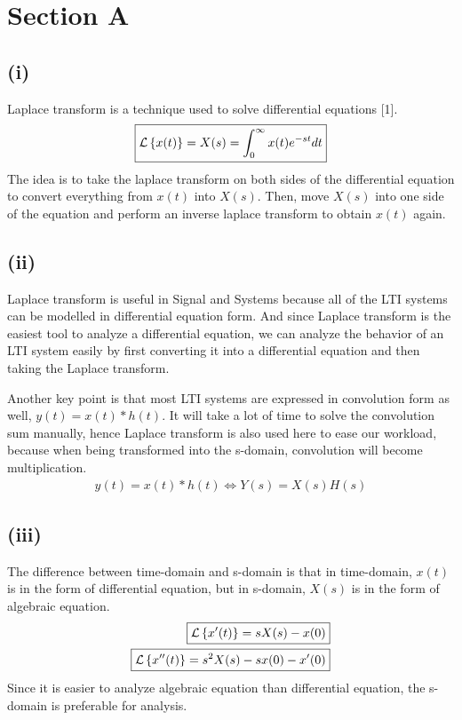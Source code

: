 \section{Section A}
\subsection{(i)}
Laplace transform is a technique used to solve differential equations [1].
\begin{align*}
    \boxed{\mathcal{L}\left\{x(t)\right\} = X(s) = \int_{0}^{\infty}x(t)e^{-st}dt}
\end{align*}
The idea is to take the laplace transform on both sides of the differential equation to convert everything from $x(t)$ into $X(s)$. Then, move $X(s)$ into one side of the equation and perform an inverse laplace transform to obtain $x(t)$ again.

\subsection{(ii)}
Laplace transform is useful in Signal and Systems because all of the LTI systems can be modelled in differential equation form. And since Laplace transform is the easiest tool to analyze a differential equation, we can analyze the behavior of an LTI system easily by first converting it into a differential equation and then taking the Laplace transform.

Another key point is that most LTI systems are expressed in convolution form as well, $y(t) = x(t) * h(t)$. It will take a lot of time to solve the convolution sum manually, hence Laplace transform is also used here to ease our workload, because when being transformed into the s-domain, convolution will become multiplication.
\begin{align*}
    \boxed{y(t)=x(t) * h(t) \Leftrightarrow Y(s)=X(s)H(s)}
\end{align*}

\subsection{(iii)}
The difference between time-domain and s-domain is that in time-domain, $x(t)$ is in the form of differential equation, but in s-domain, $X(s)$ is in the form of algebraic equation.
\begin{align*}
    \boxed{\mathcal{L}\left\{x'(t)\right\}=sX(s)-x(0)}\\
    \boxed{\mathcal{L}\left\{x''(t)\right\}=s^2X(s)-sx(0)-x'(0)}
\end{align*}
Since it is easier to analyze algebraic equation than differential equation, the s-domain is preferable for analysis.

